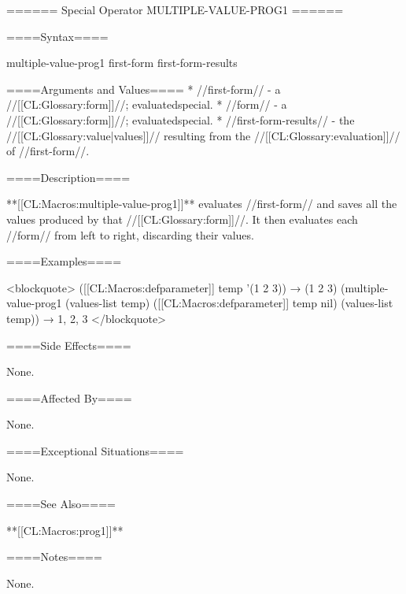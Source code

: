 ====== Special Operator MULTIPLE-VALUE-PROG1 ======

====Syntax====

\DefspecWithValues multiple-value-prog1 {first-form } {first-form-results}

====Arguments and Values====
  * //first-form// - a //[[CL:Glossary:form]]//; evaluatedspecial.
  * //form// - a //[[CL:Glossary:form]]//; evaluatedspecial.
  * //first-form-results// - the //[[CL:Glossary:value|values]]// resulting from the //[[CL:Glossary:evaluation]]// of //first-form//.

====Description====

**[[CL:Macros:multiple-value-prog1]]** evaluates //first-form// and saves all the values produced by that //[[CL:Glossary:form]]//. It then evaluates each //form// from left to right, discarding their values.

====Examples====

<blockquote> ([[CL:Macros:defparameter]] temp '(1 2 3)) → (1 2 3) (multiple-value-prog1 (values-list temp) ([[CL:Macros:defparameter]] temp nil) (values-list temp)) → 1, 2, 3 </blockquote>

====Side Effects====

None.

====Affected By====

None.

====Exceptional Situations====

None.

====See Also====

**[[CL:Macros:prog1]]**

====Notes====

None.

